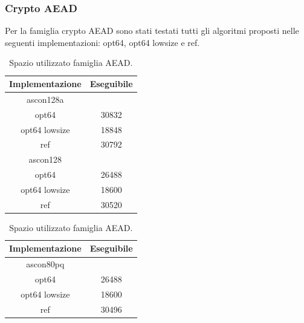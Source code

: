 \documentclass[12pt,a4paper,italian]{report}
\begin{document}
\subsubsection{Crypto AEAD}

Per la famiglia crypto AEAD sono stati testati tutti gli algoritmi proposti nelle seguenti implementazioni: opt64, opt64 lowsize e ref.

\begin{table}[h]
    \caption{Spazio utilizzato famiglia AEAD.}
    \begin{minipage}[t]{0.5\linewidth}
        \centering
        \begin{tabular}{|c|c|}
            \hline
            Implementazione & Eseguibile \\
            \hline
            ascon128a & \\
            \hline
            opt64 & 30832 \\
            \hline
            opt64 lowsize & 18848 \\
            \hline
            ref & 30792 \\
            \hline
            ascon128 & \\
            \hline
            opt64 & 26488 \\
            \hline
            opt64 lowsize & 18600 \\
            \hline
            ref & 30520 \\
            \hline
        \end{tabular}
    \end{minipage}
    \begin{minipage}[t]{0.5\linewidth}
        \centering
        \begin{tabular}{|c|c|}
            \hline
            Implementazione & Eseguibile \\
            \hline
            ascon80pq & \\
            \hline
            opt64 & 26488 \\
            \hline
            opt64 lowsize & 18600 \\
            \hline
            ref & 30496 \\
            \hline
        \end{tabular}
    \end{minipage}
\end{table}
\end{document}
